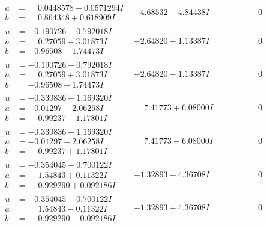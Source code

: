 \documentclass[1p]{elsarticle_modified}
\theoremstyle{definition}
\begin{document}
$$\begin{array}{c|c|c}
\begin{aligned}
a &= \phantom{-}0.0448578 - 0.0571294 I \\
b &= \phantom{-}0.864348 + 0.618909 I\end{aligned}
 & -4.68532 - 4.84438 I & \phantom{-0.000000 } 0 \\ \hline\begin{aligned}
u &= -0.190726 + 0.792018 I \\
a &= \phantom{-}0.27059 - 3.01873 I \\
b &= -0.96508 + 1.74473 I\end{aligned}
 & -2.64820 + 1.13387 I & \phantom{-0.000000 } 0 \\ \hline\begin{aligned}
u &= -0.190726 - 0.792018 I \\
a &= \phantom{-}0.27059 + 3.01873 I \\
b &= -0.96508 - 1.74473 I\end{aligned}
 & -2.64820 - 1.13387 I & \phantom{-0.000000 } 0 \\ \hline\begin{aligned}
u &= -0.330836 + 1.169320 I \\
a &= -0.01297 + 2.06258 I \\
b &= \phantom{-}0.99237 - 1.17801 I\end{aligned}
 & \phantom{-}7.41773 + 6.08000 I & \phantom{-0.000000 } 0 \\ \hline\begin{aligned}
u &= -0.330836 - 1.169320 I \\
a &= -0.01297 - 2.06258 I \\
b &= \phantom{-}0.99237 + 1.17801 I\end{aligned}
 & \phantom{-}7.41773 - 6.08000 I & \phantom{-0.000000 } 0 \\ \hline\begin{aligned}
u &= -0.354045 + 0.700122 I \\
a &= \phantom{-}1.54843 + 0.11322 I \\
b &= \phantom{-}0.929290 + 0.092186 I\end{aligned}
 & -1.32893 - 4.36708 I & \phantom{-0.000000 } 0 \\ \hline\begin{aligned}
u &= -0.354045 - 0.700122 I \\
a &= \phantom{-}1.54843 - 0.11322 I \\
b &= \phantom{-}0.929290 - 0.092186 I\end{aligned}
 & -1.32893 + 4.36708 I & \phantom{-0.000000 } 0\\

\end{array}$$
\end{document}
